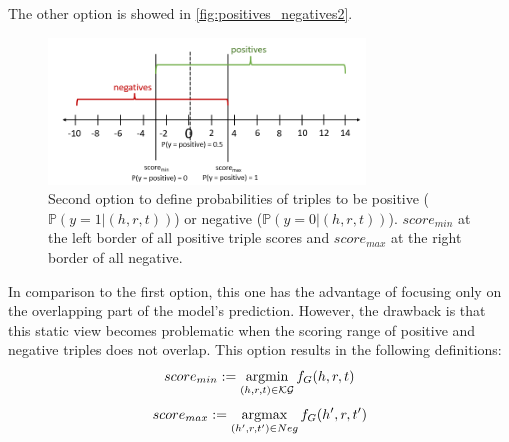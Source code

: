 The other option is showed in \autoref{fig:positives_negatives2}.
\begin{figure}[t]
  \centering
    \includegraphics[width=0.75\textwidth]{figures/positives_negatives2.PNG}
  \caption{Second option to define probabilities of triples to be positive ($\mathds{P}(y = 1 | (h,r,t))$) or negative ($\mathds{P}(y = 0 | (h,r,t))$). 
  $score_{min}$ at the left border of all positive triple scores and $score_{max}$ at the right border of all negative.}
  \label{fig:positives_negatives2}
\end{figure}
In comparison to the first option, this one has the advantage of focusing only on the overlapping part of the model's prediction.
However, the drawback is that this static view becomes problematic when the scoring range of positive and negative triples does not overlap.
This option results in the following definitions:
\begin{equation} \label{eqn:opt2_score_min}
    score_{min} := \operatorname*{argmin}_{(h,r,t) \in \mathcal{KG}}{f_G(h,r,t)}
\end{equation}
\begin{equation} \label{eqn:opt2_score_max}
    score_{max} := \operatorname*{argmax}_{(h',r,t') \in Neg}{f_G(h',r,t')}
\end{equation}

